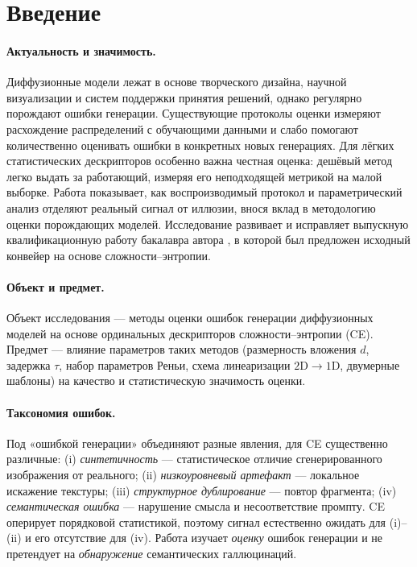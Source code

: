 \documentclass[14pt]{extarticle}
\theoremstyle{plain}
\numberwithin{equation}{section}
\numberwithin{figure}{section}
\numberwithin{table}{section}
\begin{document}
\clearpage
\tableofcontents

\clearpage
\section{Введение}\label{sec:intro}

\paragraph{Актуальность и значимость.} Диффузионные модели лежат в основе
творческого дизайна, научной визуализации и систем поддержки принятия решений,
однако регулярно порождают ошибки генерации. Существующие протоколы оценки
измеряют расхождение распределений с обучающими данными и слабо помогают
количественно оценивать ошибки в конкретных новых генерациях. Для лёгких
статистических дескрипторов особенно важна честная оценка: дешёвый метод легко
выдать за работающий, измеряя его неподходящей метрикой на малой выборке. Работа
показывает, как воспроизводимый протокол и параметрический анализ отделяют
реальный сигнал от иллюзии, внося вклад в методологию оценки порождающих моделей.
Исследование развивает и исправляет выпускную квалификационную работу бакалавра
автора \citep{pakhurov2025bachelor}, в которой был предложен исходный конвейер на
основе сложности–энтропии.

\paragraph{Объект и предмет.} Объект исследования — методы оценки ошибок генерации
диффузионных моделей на основе ординальных дескрипторов сложности–энтропии (CE).
Предмет — влияние параметров таких методов (размерность вложения $d$, задержка
$\tau$, набор параметров Реньи, схема линеаризации $2$D$\to1$D, двумерные шаблоны)
на качество и статистическую значимость оценки.

\paragraph{Таксономия ошибок.} Под «ошибкой генерации» объединяют разные явления,
для CE существенно различные: (i) \emph{синтетичность} — статистическое отличие
сгенерированного изображения от реального; (ii) \emph{низкоуровневый артефакт} —
локальное искажение текстуры; (iii) \emph{структурное дублирование} — повтор
фрагмента; (iv) \emph{семантическая ошибка} — нарушение смысла и несоответствие
промпту. CE оперирует порядковой статистикой, поэтому сигнал естественно ожидать
для (i)–(ii) и его отсутствие для (iv). Работа изучает \emph{оценку} ошибок
генерации и не претендует на \emph{обнаружение} семантических галлюцинаций.
\end{document}
